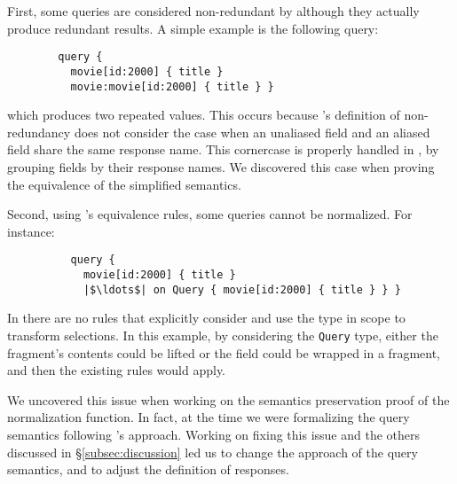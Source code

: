 First, some queries are considered non-redundant by \HP although they actually produce redundant results.
A simple example is the following query:

\begin{verbatim}
        query {
          movie[id:2000] { title }
          movie:movie[id:2000] { title } }
\end{verbatim}
which produces two repeated values. This occurs because \HP's definition of non-redundancy does not consider the case when an unaliased field and an aliased field share the same response name. This cornercase is properly handled in \gcoql, by grouping fields by their response names. We discovered this case when proving the equivalence of the simplified semantics.

Second, using \HP's equivalence rules, some queries cannot be normalized.
For instance:
\begin{verbatim}
          query {
            movie[id:2000] { title }
            |$\ldots$| on Query { movie[id:2000] { title } } }
\end{verbatim}
In \HP there are no rules that explicitly consider and use the type in scope to transform selections. In this example, by considering the \texttt{Query} type, either the fragment's contents could be lifted or the field could be wrapped in a fragment, and then the existing rules would apply. 


%
We uncovered this issue when working on the semantics preservation proof of the normalization function. In fact, at the time we were formalizing the query semantics following \HP's approach. Working on fixing this issue and the others discussed in \S\ref{subsec:discussion} led us to change the approach of the query semantics, and to adjust the definition of responses.


